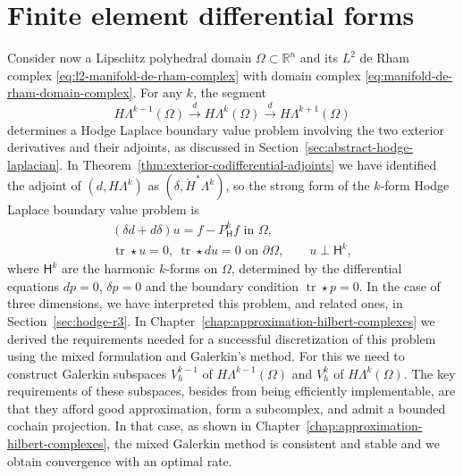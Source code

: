 \clearpage\setcounter{section}{6}
\section{{Finite element differential forms}}\label{chap:finite-element-differential-forms}

{Consider now a Lipschitz polyhedral domain $\Omega\subset\mathbb R^n$ and its $L^2$ de Rham complex \eqref{eq:l2-manifold-de-rham-complex} with domain complex \eqref{eq:manifold-de-rham-domain-complex}. For any $k$, the segment}
\begin{equation}\label{eq:finite-element-forms-short-complex}
H\Lambda^{k-1}(\Omega)\xrightarrow{d}H\Lambda^k(\Omega)\xrightarrow{d}H\Lambda^{k+1}(\Omega)
\end{equation}
{determines a Hodge Laplace boundary value problem involving the two exterior derivatives and their adjoints, as discussed in Section~\ref{sec:abstract-hodge-laplacian}. In Theorem~\ref{thm:exterior-codifferential-adjoints} we have identified the adjoint of $(d,H\Lambda^k)$ as $(\delta,\mathring H^*\Lambda^k)$, so the strong form of the $k$-form Hodge Laplace boundary value problem is}
\begin{equation}\label{eq:finite-element-forms-hodge-strong}
\begin{gathered}
(\delta d+d\delta)u=f-P_{\mathsf H}^kf\text{ in }\Omega,\\
\operatorname{tr}\star u=0,\ \operatorname{tr}\star du=0\text{ on }\partial\Omega,\qquad u\perp\mathsf H^k,
\end{gathered}
\end{equation}
{where $\mathsf H^k$ are the harmonic $k$-forms on $\Omega$, determined by the differential equations $dp=0$, $\delta p=0$ and the boundary condition $\operatorname{tr}\star p=0$. In the case of three dimensions, we have interpreted this problem, and related ones, in Section~\ref{sec:hodge-r3}. In Chapter~\ref{chap:approximation-hilbert-complexes} we derived the requirements needed for a successful discretization of this problem using the mixed formulation and Galerkin's method. For this we need to construct Galerkin subspaces $V_h^{k-1}$ of $H\Lambda^{k-1}(\Omega)$ and $V_h^k$ of $H\Lambda^k(\Omega)$. The key requirements of these subspaces, besides from being efficiently implementable, are that they afford good approximation, form a subcomplex, and admit a bounded cochain projection. In that case, as shown in Chapter~\ref{chap:approximation-hilbert-complexes}, the mixed Galerkin method is consistent and stable and we obtain convergence with an optimal rate.}

